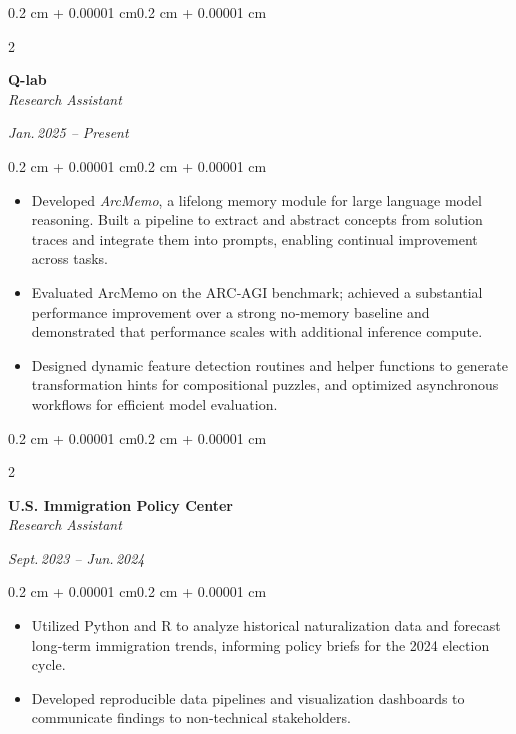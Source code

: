 \documentclass[10pt, letterpaper]{article}
\newenvironment{highlights}{
    \begin{itemize}[
        topsep=0.10 cm,
        parsep=0.10 cm,
        partopsep=0pt,
        itemsep=0pt,
        leftmargin=0.4 cm + 10pt
    ]
}{\end{itemize}}
\newenvironment{onecolentry}{
    \begin{adjustwidth}{0.2 cm + 0.00001 cm}{0.2 cm + 0.00001 cm}
}{\end{adjustwidth}}
\newenvironment{twocolentry}[2][]{
    \onecolentry
    \def\secondColumn{#2}
    \setcolumnwidth{\fill, 4.5 cm}
    \begin{paracol}{2}
}{
    \switchcolumn \raggedleft \secondColumn
    \end{paracol}
    \endonecolentry
}
\begin{document}
    \begin{twocolentry}{\textit{Jan.\,2025 -- Present}}
        \textbf{Q-lab}\\
        \textit{Research Assistant}
    \end{twocolentry}

    \vspace{0.10 cm}
    \begin{onecolentry}
        \begin{highlights}
            \item Developed \emph{ArcMemo}, a lifelong memory module for large language model reasoning. Built a pipeline to extract and abstract concepts from solution traces and integrate them into prompts, enabling continual improvement across tasks.
            \item Evaluated ArcMemo on the ARC‑AGI benchmark; achieved a substantial performance improvement over a strong no‑memory baseline and demonstrated that performance scales with additional inference compute.
            \item Designed dynamic feature detection routines and helper functions to generate transformation hints for compositional puzzles, and optimized asynchronous workflows for efficient model evaluation.
        \end{highlights}
    \end{onecolentry}

    \vspace{0.20 cm}

    \begin{twocolentry}{\textit{Sept.\,2023 -- Jun.\,2024}}
        \textbf{U.S. Immigration Policy Center}\\
        \textit{Research Assistant}
    \end{twocolentry}

    \vspace{0.10 cm}
    \begin{onecolentry}
        \begin{highlights}
            \item Utilized Python and R to analyze historical naturalization data and forecast long‑term immigration trends, informing policy briefs for the 2024 election cycle.
            \item Developed reproducible data pipelines and visualization dashboards to communicate findings to non‑technical stakeholders.
        \end{highlights}
    \end{onecolentry}
\end{document}
